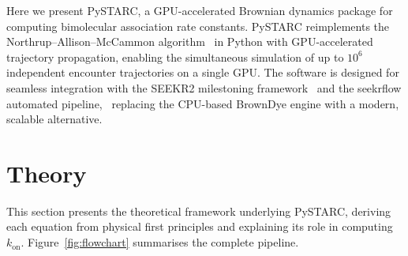 \documentclass[journal=jctcce,manuscript=article,layout=twocolumn]{achemso}
\newcommand{\kon}{k_{\mathrm{on}}}
\begin{document}
Here we present PySTARC, a GPU-accelerated Brownian dynamics package for computing bimolecular
association rate constants. PySTARC reimplements the Northrup--Allison--McCammon
algorithm~\cite{Northrup1984} in Python with GPU-accelerated trajectory propagation,
enabling the simultaneous simulation of up to $10^6$ independent encounter trajectories
on a single GPU. The software is designed for seamless integration with the SEEKR2
milestoning framework~\cite{Votapka2022SEEKR2} and the seekrflow automated
pipeline,~\cite{Ojha2025seekrflow} replacing the CPU-based BrownDye engine with a
modern, scalable alternative.


\section{Theory}
\label{sec:theory}

This section presents the theoretical framework underlying PySTARC,
deriving each equation from physical first principles and explaining
its role in computing $\kon$.
Figure~\ref{fig:flowchart} summarises the complete pipeline.
\end{document}
